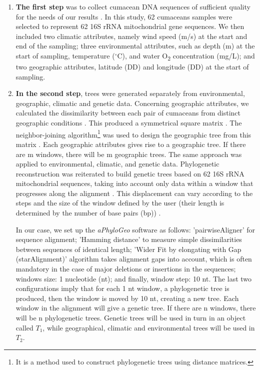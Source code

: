 \begin{enumerate}
\item \textbf{The first step} was to collect cumacean DNA sequences of sufficient quality for the needs of our results \citep{koshkarov_phylogeography_2022}. In this study, 62 cumaceans samples were selected to represent 62 16S rRNA mitochondrial gene sequences. We then included two climatic attributes, namely wind speed (m/s) at the start and end of the sampling; three environmental attributes, such as depth (m) at the start of sampling, temperature ($^\circ$C), and water O\textsubscript{2} concentration (mg/L); and two geographic attributes, latitude (DD) and longitude (DD) at the start of sampling.

\item \textbf{In the second step}, trees were generated separately from environmental, geographic, climatic and genetic data. Concerning geographic attributes, we calculated the dissimilarity between each pair of cumaceans from distinct geographic conditions \citep{koshkarov_phylogeography_2022}. This produced a symmetrical square matrix \citep{koshkarov_phylogeography_2022}. The {neighbor-joining algorithm}\footnote{It is a method used to construct phylogenetic trees using distance matrices.} was used to design the geographic tree from this matrix \citep{koshkarov_phylogeography_2022}. Each geographic attributes gives rise to a geographic tree. If there are m windows, there will be m geographic trees. The same approach was applied to environmental, climatic, and genetic data. Phylogenetic reconstruction was reiterated to build genetic trees based on 62 16S rRNA mitochondrial sequences, taking into account only data within a window that progresses along the alignment \citep{koshkarov_phylogeography_2022}. This displacement can vary according to the steps and the size of the window defined by the user (their length is determined by the number of base pairs (bp)) \citep{koshkarov_phylogeography_2022}. 

In our case, we set up the \textit{aPhyloGeo} software as follows: 'pairwiseAligner' for sequence alignment; 'Hamming distance' to measure simple dissimilarities between sequences of identical length; 'Wider Fit by elongating with Gap (starAlignment)' algorithm takes alignment gaps into account, which is often mandatory in the case of major deletions or insertions in the sequences; windows size: 1 nucleotide (nt); and finally, window step: 10 nt. The last two configurations imply that for each 1 nt window, a phylogenetic tree is produced, then the window is moved by 10 nt, creating a new tree. Each window in the alignment will give a genetic tree. If there are n windows, there will be n phylogenetic trees. Genetic trees will be used in turn in an object called  $T_1$, while geographical, climatic and environmental trees will be used in  $T_2$.


\end{enumerate}
